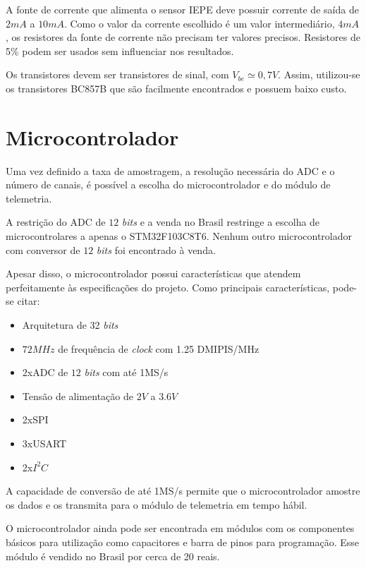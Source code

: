 \documentclass[11pt]{abntex2}
\begin{document}
				A fonte de corrente que alimenta o sensor IEPE deve possuir
				corrente de saída de $2mA$ a $10mA$. Como o valor da corrente
				escolhido é um valor intermediário, $4mA$, os resistores da
				fonte de corrente não precisam ter valores precisos. Resistores
				de 5\% podem ser usados sem influenciar nos resultados.

				Os transistores devem ser transistores de sinal, com
				$V_{be}\simeq 0,7V$. Assim, utilizou-se os transistores BC857B
				que são facilmente encontrados e possuem baixo custo.

			\section{Microcontrolador}
				Uma vez definido a taxa de amostragem, a resolução necessária do
				ADC e o número de canais, é possível a escolha do
				microcontrolador e do módulo de telemetria.

				A restrição do ADC de $12$ \textit{bits} e a venda no Brasil
				restringe a escolha de microcontrolares a apenas o
				STM32F103C8T6.\cite{stm} Nenhum outro microcontrolador com conversor de
				$12$ \textit{bits} foi encontrado à venda.

				Apesar disso, o microcontrolador possui características que
				atendem perfeitamente às especificações do projeto. Como
				principais características, pode-se citar:

				\begin{itemize}
					\item Arquitetura de 32 \textit{bits}
					\item $72MHz$ de frequência de \textit{clock} com 1.25 DMIPIS/MHz
					\item 2xADC de $12$ \textit{bits} com até 1MS/s
					\item Tensão de alimentação de $2V$ a $3.6V$
					\item 2xSPI
					\item 3xUSART
					\item 2x$I^2C$
				\end{itemize}

				A capacidade de conversão de até 1MS/s permite que o
				microcontrolador amostre os dados e os transmita para o módulo
				de telemetria em tempo hábil.
				
				O microcontrolador ainda pode ser encontrada em módulos com os
				componentes básicos para utilização como capacitores e barra de
				pinos para programação. Esse módulo é vendido no Brasil por
				cerca de 20 reais.
\end{document}
